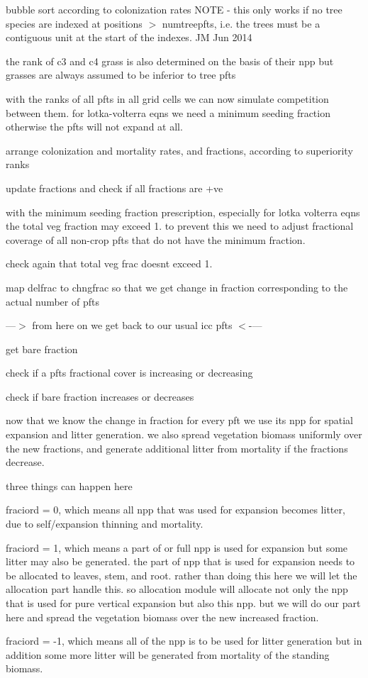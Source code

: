 bubble sort according to colonization rates N\+O\+T\+E -\/ this only works if no tree species are indexed at positions $>$ numtreepfts, i.\+e. the trees must be a contiguous unit at the start of the indexes. J\+M Jun 2014

the rank of c3 and c4 grass is also determined on the basis of their npp but grasses are always assumed to be inferior to tree pfts

with the ranks of all pfts in all grid cells we can now simulate competition between them. for lotka-\/volterra eqns we need a minimum seeding fraction otherwise the pfts will not expand at all.

arrange colonization and mortality rates, and fractions, according to superiority ranks

update fractions and check if all fractions are +ve

with the minimum seeding fraction prescription, especially for lotka volterra eqns the total veg fraction may exceed 1. to prevent this we need to adjust fractional coverage of all non-\/crop pfts that do not have the minimum fraction.

check again that total veg frac doesn\textquotesingle{}t exceed 1.

map delfrac to chngfrac so that we get change in fraction corresponding to the actual number of pfts

---$>$ from here on we get back to our usual icc pfts $<$-\/---

get bare fraction

check if a pft\textquotesingle{}s fractional cover is increasing or decreasing

check if bare fraction increases or decreases

now that we know the change in fraction for every pft we use its npp for spatial expansion and litter generation. we also spread vegetation biomass uniformly over the new fractions, and generate additional litter from mortality if the fractions decrease.

three things can happen here


\begin{DoxyEnumerate}
\item fraciord = 0, which means all npp that was used for expansion becomes litter, due to self/expansion thinning and mortality.
\item fraciord = 1, which means a part of or full npp is used for expansion but some litter may also be generated. the part of npp that is used for expansion needs to be allocated to leaves, stem, and root. rather than doing this here we will let the allocation part handle this. so allocation module will allocate not only the npp that is used for pure vertical expansion but also this npp. but we will do our part here and spread the vegetation biomass over the new increased fraction.
\item fraciord = -\/1, which means all of the npp is to be used for litter generation but in addition some more litter will be generated from mortality of the standing biomass.
\end{DoxyEnumerate}

